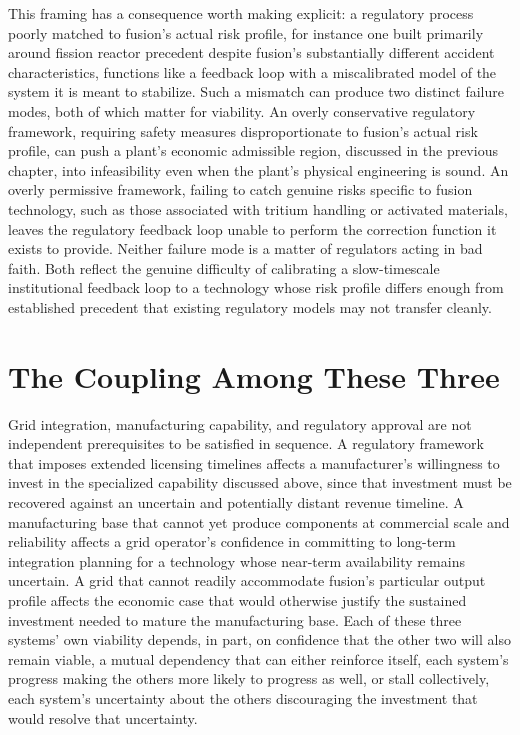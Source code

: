 This framing has a consequence worth making explicit: a regulatory process poorly matched to fusion's actual risk profile, for instance one built primarily around fission reactor precedent despite fusion's substantially different accident characteristics, functions like a feedback loop with a miscalibrated model of the system it is meant to stabilize. Such a mismatch can produce two distinct failure modes, both of which matter for viability. An overly conservative regulatory framework, requiring safety measures disproportionate to fusion's actual risk profile, can push a plant's economic admissible region, discussed in the previous chapter, into infeasibility even when the plant's physical engineering is sound. An overly permissive framework, failing to catch genuine risks specific to fusion technology, such as those associated with tritium handling or activated materials, leaves the regulatory feedback loop unable to perform the correction function it exists to provide. Neither failure mode is a matter of regulators acting in bad faith. Both reflect the genuine difficulty of calibrating a slow-timescale institutional feedback loop to a technology whose risk profile differs enough from established precedent that existing regulatory models may not transfer cleanly.

\section{The Coupling Among These Three}

Grid integration, manufacturing capability, and regulatory approval are not independent prerequisites to be satisfied in sequence. A regulatory framework that imposes extended licensing timelines affects a manufacturer's willingness to invest in the specialized capability discussed above, since that investment must be recovered against an uncertain and potentially distant revenue timeline. A manufacturing base that cannot yet produce components at commercial scale and reliability affects a grid operator's confidence in committing to long-term integration planning for a technology whose near-term availability remains uncertain. A grid that cannot readily accommodate fusion's particular output profile affects the economic case that would otherwise justify the sustained investment needed to mature the manufacturing base. Each of these three systems' own viability depends, in part, on confidence that the other two will also remain viable, a mutual dependency that can either reinforce itself, each system's progress making the others more likely to progress as well, or stall collectively, each system's uncertainty about the others discouraging the investment that would resolve that uncertainty.


